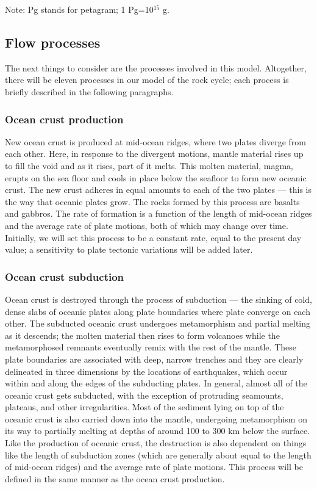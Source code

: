 \documentclass[11pt,letterpaper]{article}
\begin{document}
Note: Pg stands for petagram; 1 Pg=10$^{15}$ g.


\subsection{Flow processes}
The next things to consider are the processes involved in this model. Altogether, there will be eleven processes in our model of the rock cycle; each process is briefly described in the following paragraphs.

\subsubsection{Ocean crust production}
New ocean crust is produced at mid-ocean ridges, where two plates diverge from each other. Here, in response to the divergent motions, mantle material rises up to fill the void and as it rises, part of it melts. This molten material, magma, erupts on the sea floor and cools in place below the seafloor to form new oceanic crust. The new crust adheres in equal amounts to each of the two plates --- this is the way that oceanic plates grow. The rocks formed by this process are basalts and gabbros. The rate of formation is a function of the length of mid-ocean ridges and the average rate of plate motions, both of which may change over time. Initially, we will set this process to be a constant rate, equal to the present day value; a sensitivity to plate tectonic variations will be added later.

\subsubsection{Ocean crust subduction}
Ocean crust is destroyed through the process of subduction --- the sinking of cold, dense slabs of oceanic plates along plate boundaries where plate converge on each other. The subducted oceanic crust undergoes metamorphism and partial melting as it descends; the molten material then rises to form volcanoes while the metamorphosed remnants eventually remix with the rest of the mantle. These plate boundaries are associated with deep, narrow trenches and they are clearly delineated in three dimensions by the locations of earthquakes, which occur within and along the edges of the subducting plates. In general, almost all of the oceanic crust gets subducted, with the exception of protruding seamounts, plateaus, and other irregularities. Most of the sediment lying on top of the oceanic crust is also carried down into the mantle, undergoing metamorphism on its way to partially melting at depths of around 100 to 300 km below the surface. Like the production of oceanic crust, the destruction is also dependent on things like the length of subduction zones (which are generally about equal to the length of mid-ocean ridges) and the average rate of plate motions. This process will be defined in the same manner as the ocean crust production.
\end{document}
